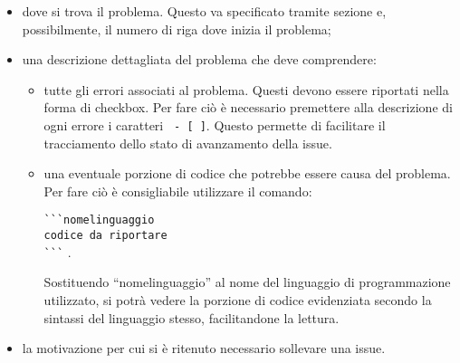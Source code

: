 \documentclass[../NormeProgetto.tex]{subfiles}
\begin{document}
		\begin{itemize} 
			\item dove si trova il problema. Questo va specificato tramite sezione e, possibilmente, il numero di riga dove inizia il problema;
			\item una descrizione dettagliata del problema che deve comprendere:
			\begin{itemize}
				\item tutte gli errori associati al problema. Questi devono essere riportati nella forma di checkbox. Per fare ciò è necessario premettere alla descrizione di ogni errore i caratteri \texttt{ - [ ]}. Questo permette di facilitare il tracciamento dello stato di avanzamento della issue.
				\item una eventuale porzione di codice che potrebbe essere causa del problema. Per fare ciò è consigliabile utilizzare il comando: \begin{center} \texttt {\`{}\`{}\`{}nomelinguaggio\\ codice da riportare\\ \`{}\`{}\`{}} .\end{center} Sostituendo ``nomelinguaggio'' al nome del linguaggio di programmazione utilizzato, si potrà vedere la porzione di codice evidenziata secondo la sintassi del linguaggio stesso, facilitandone la lettura.
			\end{itemize}
			\item la motivazione per cui si è ritenuto necessario sollevare una issue.
		\end{itemize}
		
\end{document}
